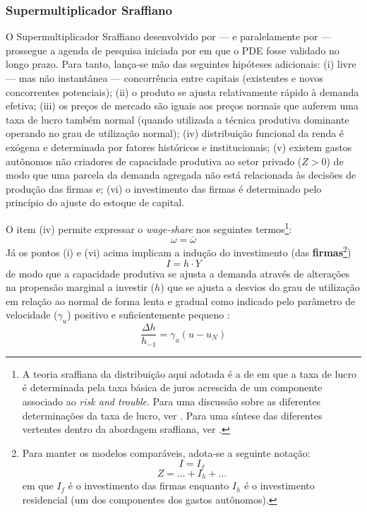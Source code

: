 \subsubsection{Supermultiplicador Sraffiano}\label{SecSuper}

O Supermultiplicador Sraffiano desenvolvido por \textcite{serrano_sraffian_1995} --- e paralelamente por \textcite{bortis_institutions_1996} --- prossegue a agenda de pesquisa iniciada por \textcite{garegnani_problem_2015} em que o PDE fosse validado no longo prazo. 
Para tanto, lança-se mão das seguintes hipóteses adicionais: 
	(i) livre --- mas não instantânea --- concorrência entre capitais (existentes e novos concorrentes potenciais);
	(ii) o produto se ajusta relativamente rápido à demanda efetiva;
	(iii) os preços de mercado são iguais aos preços normais que auferem uma taxa de lucro também normal (quando utilizada a técnica produtiva dominante operando no grau de utilização normal);
	(iv) distribuição funcional da renda é exógena e determinada por fatores históricos e institucionais;
	(v) existem gastos autônomos não criadores de capacidade produtiva ao setor privado ($Z>0$) de modo que uma parcela da demanda agregada não está relacionada às decisões de produção das firmas e;
	(vi) o investimento das firmas é determinado pelo princípio do ajuste do estoque de capital.

O item (iv) permite expressar o \textit{wage-share} nos seguintes termos\footnote{
	A teoria sraffiana da distribuição aqui adotada é a de \textcite{pivetti_essay_1992} em que a taxa de lucro é determinada pela taxa básica de juros acrescida de um componente associado ao \textit{risk and trouble}.
	Para uma discussão sobre as diferentes determinações da taxa de lucro, ver \textcite{serrano_teoria_1988}.
	Para uma síntese das diferentes vertentes dentro da abordagem sraffiana, ver \textcite{aspromourgos_sraffian_2004}.
}:
$$
\omega = \overline \omega
$$
Já os pontos (i) e (vi) acima implicam a indução do investimento (das \textbf{firmas}\footnote{
	Para manter os modelos comparáveis, adota-se a seguinte notação:
	$$
	I = I_f
	$$
	$$
	Z = \ldots + I_h + \ldots
	$$
	em que $I_f$ é o investimento das firmas enquanto $I_h$ é o investimento residencial (um dos componentes dos gastos autônomos).
}) 
$$
I = h\cdot Y
$$
de modo que a capacidade produtiva se ajusta a demanda através de alterações na propensão marginal a investir ($h$) que se ajusta a desvios do grau de utilização em relação ao normal de forma lenta e gradual como indicado pelo parâmetro de velocidade ($\gamma_u$) positivo e suficientemente pequeno \cite[p.~271]{freitas_growth_2015}:
$$
\frac{\Delta h}{h_{-1}} = \gamma_u (u - u_N)
$$

